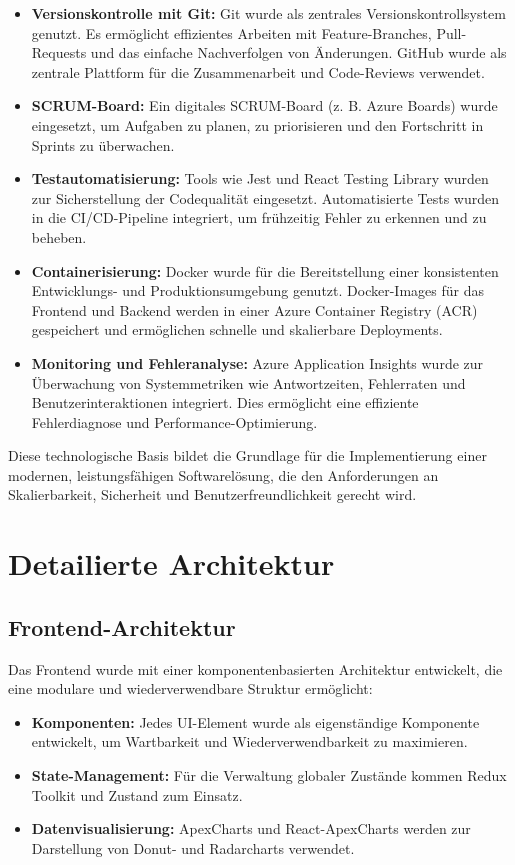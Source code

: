\begin{itemize}
    \item \textbf{Versionskontrolle mit Git:} Git wurde als zentrales Versionskontrollsystem genutzt. Es ermöglicht effizientes Arbeiten mit Feature-Branches, Pull-Requests und das einfache Nachverfolgen von Änderungen. GitHub wurde als zentrale Plattform für die Zusammenarbeit und Code-Reviews verwendet.
    
    \item \textbf{SCRUM-Board:} Ein digitales SCRUM-Board (z. B. Azure Boards) wurde eingesetzt, um Aufgaben zu planen, zu priorisieren und den Fortschritt in Sprints zu überwachen.

    \item \textbf{Testautomatisierung:} Tools wie Jest und React Testing Library wurden zur Sicherstellung der Codequalität eingesetzt. Automatisierte Tests wurden in die CI/CD-Pipeline integriert, um frühzeitig Fehler zu erkennen und zu beheben.

    \item \textbf{Containerisierung:} Docker wurde für die Bereitstellung einer konsistenten Entwicklungs- und Produktionsumgebung genutzt. Docker-Images für das Frontend und Backend werden in einer Azure Container Registry (ACR) gespeichert und ermöglichen schnelle und skalierbare Deployments.
    
    \item \textbf{Monitoring und Fehleranalyse:} Azure Application Insights wurde zur Überwachung von Systemmetriken wie Antwortzeiten, Fehlerraten und Benutzerinteraktionen integriert. Dies ermöglicht eine effiziente Fehlerdiagnose und Performance-Optimierung.
\end{itemize}

Diese technologische Basis bildet die Grundlage für die Implementierung einer modernen, leistungsfähigen Softwarelösung, die den Anforderungen an Skalierbarkeit, Sicherheit und Benutzerfreundlichkeit gerecht wird.

\section{Detailierte Architektur}
\subsection{Frontend-Architektur}
Das Frontend wurde mit einer komponentenbasierten Architektur entwickelt, die eine modulare und wiederverwendbare Struktur ermöglicht:
\begin{itemize}
    \item \textbf{Komponenten:} Jedes UI-Element wurde als eigenständige Komponente entwickelt, um Wartbarkeit und Wiederverwendbarkeit zu maximieren.
    \item \textbf{State-Management:} Für die Verwaltung globaler Zustände kommen Redux Toolkit und Zustand zum Einsatz.
    \item \textbf{Datenvisualisierung:} ApexCharts und React-ApexCharts werden zur Darstellung von Donut- und Radarcharts verwendet.
\end{itemize}

